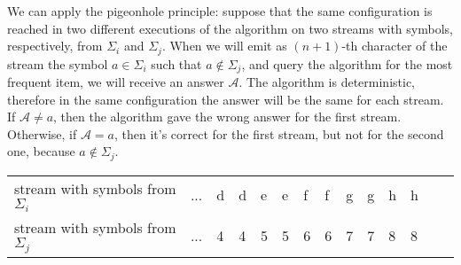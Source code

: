 We can apply the pigeonhole principle: suppose that the same configuration is reached in two different executions of the algorithm on two streams with symbols, respectively, from $\Sigma_i$ and $\Sigma_j$. When we will emit as $(n+1)$-th character of the stream the symbol $a \in \Sigma_i$ such that $a \notin \Sigma_j$, and query the algorithm for the most frequent item, we will receive an answer $\mathcal{A}$. The algorithm is deterministic, therefore in the same configuration the answer will be the same for each stream. If $\mathcal{A} \neq a$, then the algorithm gave the wrong answer for the first stream. Otherwise, if $\mathcal{A} = a$, then it's correct for the first stream, but not for the second one, because $a \notin \Sigma_j$.

\begin{table}[h]
  \centering
  \begin{tabular}{l|l|l|l|l|l|l|l|l|l|l|l|l|l|}
    \cline{2-12}
    stream with symbols from $\Sigma_i$ & ... & d & d & e & e & f & f & g & g & h & h \\ \cline{2-12} 
    stream with symbols from $\Sigma_j$ & ... & 4 & 4 & 5 & 5 & 6 & 6 & 7 & 7 & 8 & 8 \\ \cline{2-12} 
  \end{tabular}
\end{table}
